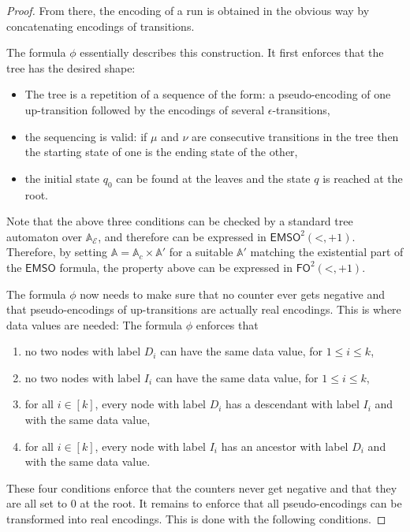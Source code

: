 \documentclass{CSML}
\newcommand\neighbor{\ensuremath{\mathord{+}1}}
\newcommand\descendant{\ensuremath{\mathord{<}}}
\newcommand\fo{\mathsf{FO}\xspace}   \newcommand\mso{\mathsf{MSO}\xspace} \newcommand\emso{\mathsf{E}\mso}     \newcommand\fotwo{\ensuremath{\fo^2(\descendant,\neighbor,\mathord{\sim})}\xspace}
\newcommand\A{\ensuremath{\mathbb{A}}\xspace}
\newcommand\Ea{\mathcal{E}}
\begin{document}
\begin{proof}
\noindent
From there, the encoding of a run is obtained in the obvious way by concatenating
encodings of transitions.

The formula $\phi$ essentially describes this construction. It first enforces
that the tree has the desired shape: 
\begin{itemize}
\item The tree is a repetition of a sequence of the form: a pseudo-encoding 
of one up-transition followed by the encodings of several $\epsilon$-transitions,
\item the sequencing is valid: if $\mu$ and $\nu$ are consecutive transitions
  in the tree then the starting state of one is the ending state of the other,
\item the initial state $q_0$ can be found at the leaves 
and the state $q$ is reached at the root.
\end{itemize}
Note that the above three conditions can be checked by a standard tree
automaton over $\A_\Ea$, and therefore can be expressed in $\emso^2(\descendant,\neighbor)$.
Therefore, by setting $\A=\A_c\times\A'$ for a
suitable $\A'$ matching the existential part of the $\emso$ formula, 
the property above can be expressed in $\fo^2(\descendant,\neighbor)$.

The formula $\phi$ now needs to make sure that no counter ever gets negative and that
pseudo-encodings of up-transitions are actually real encodings. 
This is where
data values are needed:
The formula $\phi$ enforces that 
\begin{enumerate}[label=\enspace(\arabic*)]
\item \label{it:Di} no two nodes with label $D_i$
      can have the same data value, for $1 \leq i \leq k$,
\item \label{it:Ii} no two nodes with label $I_i$
      can have the same data value, for $1 \leq i \leq k$,
\item \label{it:DiIi} for all $i\in[k]$, every node with label $D_i$ has a descendant 
      with label $I_i$ and with the same data value,
\item \label{it:IiDi} for all $i\in[k]$, every node with label $I_i$ has an ancestor 
      with label $D_i$ and with the same data value.
\end{enumerate}
These four conditions enforce that the counters never get negative and that
they are all set to $0$ at the root.  It remains to enforce that all
pseudo-encodings can be transformed into real encodings.  
This is done with the following conditions.
\enlargethispage{\baselineskip}


\end{proof}
\end{document}
